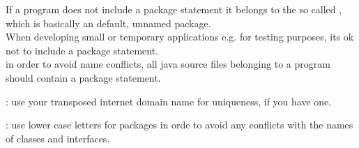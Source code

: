 \begin{stylebox}\nospacing
  \begin{itemizenosep}
    \item 
  If a program does not include a package statement it belongs to the so called
  , which is basically an default, unnamed package.\\
  When developing small or temporary applications e.g. for testing purposes, its
  ok not to include a package statement.\\
   in order to avoid name conflicts, all java source files belonging to
  a program should contain a package statement.
    \item {}: use your transposed internet domain name for
  uniqueness, if you have one.
    \item {}: use lower case letters for packages in orde
      to avoid any conflicts with the names of classes and interfaces.
  \end{itemizenosep}
\end{stylebox}

